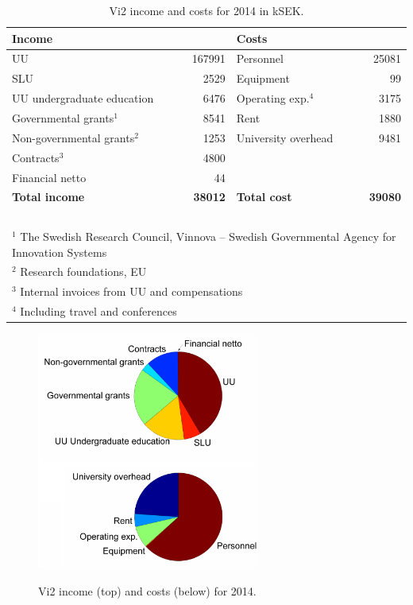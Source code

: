 \begin{table}[h]
\caption{Vi2 income and costs for 2014 in kSEK. \label{table:balance}}
\begin{center}
\begin{tabular}{|lr|lr|}
\hline
{\bf Income } & & {\bf Costs } & \\
\hline
UU  & 167991 & Personnel & 25081 \\
SLU & 2529 & Equipment & 99 \\
UU undergraduate education & 6476 &Operating exp.$^4$ &3175\\
Governmental grants$^1$ & 8541 & Rent & 1880 \\
Non-governmental grants$^2$ & 1253& University overhead & 9481\\
Contracts$^3$ & 4800  &  & \\
Financial netto & 44 & &\\
\hline
{\bf Total income } & {\bf 38012} & {\bf Total cost} & {\bf 39080} \\
\hline
\multicolumn{4}{l}{\small ~~~} \\
\multicolumn{4}{l}{$^1$ The Swedish Research Council, Vinnova -- Swedish Governmental Agency for Innovation Systems}\\
\multicolumn{4}{l}{$^2$ Research foundations, EU}\\
\multicolumn{4}{l}{$^3$ Internal invoices from UU and compensations}\\
\multicolumn{4}{l}{$^4$ Including travel and conferences}\\
\end{tabular}
\label{economy}
\end{center}
\end{table}

\begin{figure}[!b]
\centering

\includegraphics[width=0.65\textwidth]{./matlab/incomecost_color.png}\\

\caption{Vi2 income (top) and costs (below) for 2014.\label{fig:piechart}}
\label{Vi2incomecosts}
\end{figure}

